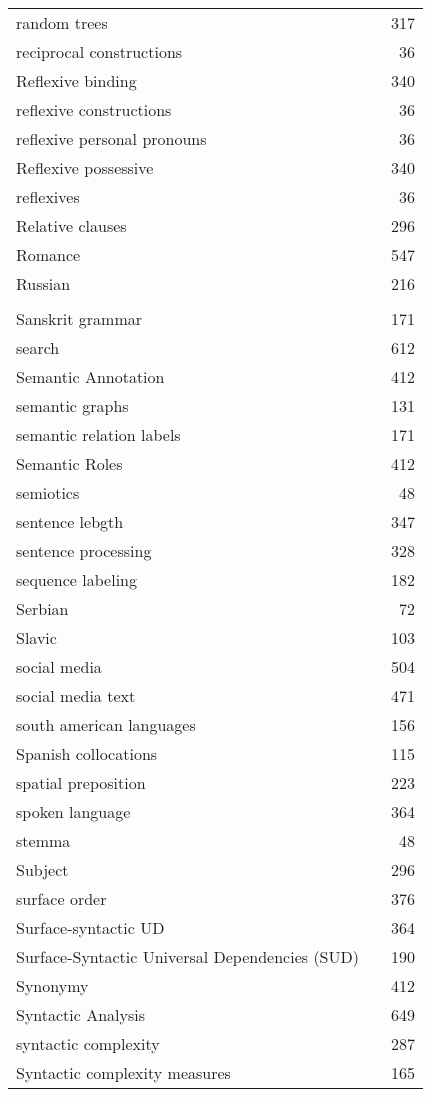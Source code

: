 \documentclass{easychair}
\begin{document}
\begin{longtable}{lp{7em}r}
random trees & & 317 
\\
reciprocal constructions & & 36 
\\
Reflexive binding & & 340 
\\
reflexive constructions & & 36 
\\
reflexive personal pronouns & & 36 
\\
Reflexive possessive & & 340 
\\
reflexives & & 36 
\\
Relative clauses & & 296 
\\
Romance & & 547 
\\
Russian & & 216 
\\
\\
Sanskrit grammar & & 171 
\\
search & & 612 
\\
Semantic Annotation & & 412 
\\
semantic graphs & & 131 
\\
semantic relation labels & & 171 
\\
Semantic Roles & & 412 
\\
semiotics & & 48 
\\
sentence lebgth & & 347 
\\
sentence processing & & 328 
\\
sequence labeling & & 182 
\\
Serbian & & 72 
\\
Slavic & & 103 
\\
social media & & 504 
\\
social media text & & 471 
\\
south american languages & & 156 
\\
Spanish collocations & & 115 
\\
spatial preposition & & 223 
\\
spoken language & & 364 
\\
stemma & & 48 
\\
Subject & & 296 
\\
surface order & & 376 
\\
Surface-syntactic UD & & 364 
\\
Surface-Syntactic Universal Dependencies (SUD) & & 190 
\\
Synonymy & & 412 
\\
Syntactic Analysis & & 649 
\\
syntactic complexity & & 287 
\\
Syntactic complexity measures & & 165 
\\

\end{longtable}
\end{document}

